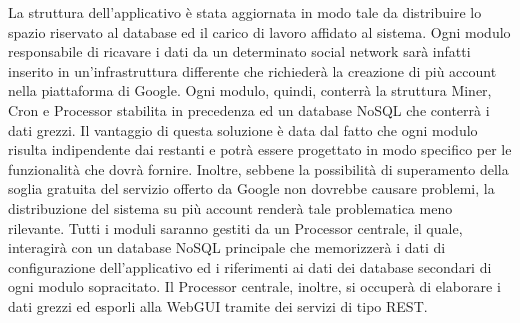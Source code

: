 La struttura dell'applicativo è stata aggiornata in modo tale da distribuire lo spazio riservato al database ed il carico di lavoro affidato al sistema. Ogni modulo responsabile di ricavare i dati da un determinato social network sarà infatti inserito in un'infrastruttura differente che richiederà la creazione di più account nella piattaforma di Google. \newline 
Ogni modulo, quindi, conterrà la struttura Miner, Cron e Processor stabilita in precedenza ed un database NoSQL che conterrà i dati grezzi. Il vantaggio di questa soluzione è data dal fatto che ogni modulo risulta indipendente dai restanti e potrà essere progettato in modo specifico per le funzionalità che dovrà fornire. Inoltre, sebbene la possibilità di superamento della soglia gratuita del servizio offerto da Google non dovrebbe causare problemi, la distribuzione del sistema su più account renderà tale problematica meno rilevante. \newline
Tutti i moduli saranno gestiti da un Processor centrale, il quale, interagirà con un database NoSQL principale che memorizzerà i dati di configurazione dell'applicativo ed i riferimenti ai dati dei database secondari di ogni modulo sopracitato. Il Processor centrale, inoltre, si occuperà di elaborare i dati grezzi ed esporli alla WebGUI tramite dei servizi di tipo REST.

